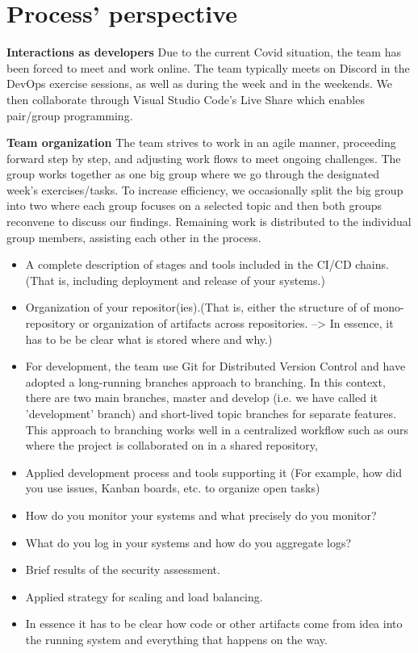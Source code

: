 \section{Process' perspective}

\textbf{Interactions as developers}\newline
  Due to the current Covid situation, the team has been forced to meet and work online. The team typically meets on Discord in the DevOps
  exercise sessions, as well as during the week and in the weekends. We then collaborate through Visual Studio Code's Live Share which enables pair/group programming. 
  \newline
 
\textbf{Team organization}\newline
  The team strives to work in an agile manner, proceeding forward step by step, and adjusting work flows to meet ongoing challenges. The group works together as one big group where we go through the designated week's exercises/tasks. 
  To increase efficiency, we occasionally split the big group into two where each group focuses on a selected topic
  and then both groups reconvene to discuss our findings. Remaining work is distributed to the individual group members, assisting each other in the process.

  
  \begin{itemize}
  \item A complete description of stages and tools included in the CI/CD chains.(That is, including deployment and release of your systems.)
  \item Organization of your repositor(ies).(That is, either the structure of of mono-repository or organization of artifacts across repositories. --> In essence, it has to be be clear what is stored where and why.) 
  \item For development, the team use Git for Distributed Version Control and have adopted a long-running branches approach to branching. In this context, there are two main branches, master and develop 
  (i.e. we have called it 'development' branch) and short-lived topic branches for separate features. This approach to branching works well in a centralized workflow such as ours where the project is collaborated on in a shared
  repository,
  \item Applied development process and tools supporting it (For example, how did you use issues, Kanban boards, etc. to organize open tasks)
  \item How do you monitor your systems and what precisely do you monitor?
  \item What do you log in your systems and how do you aggregate logs?
  \item Brief results of the security assessment.
  \item Applied strategy for scaling and load balancing.
  \item In essence it has to be clear how code or other artifacts come from idea into the running system and everything that happens on the way.
  
\end{itemize}